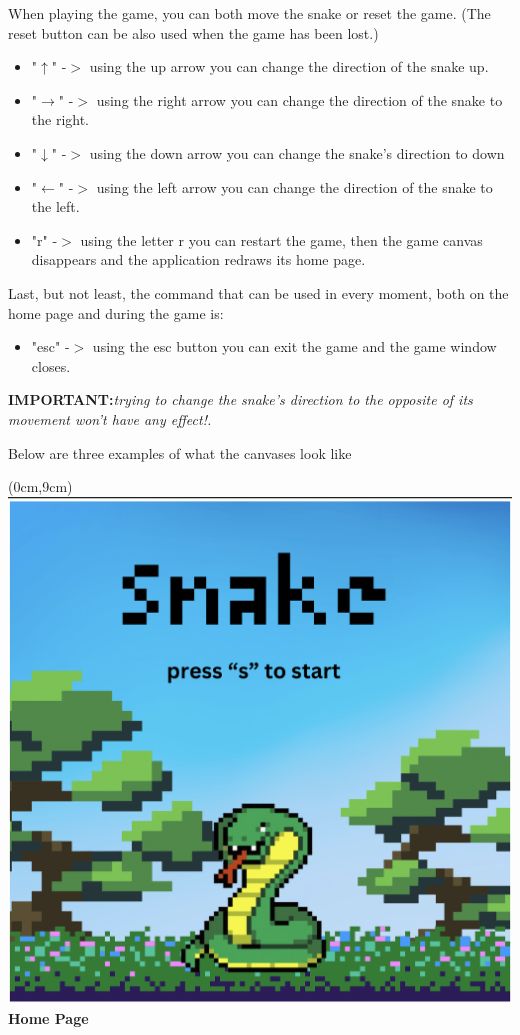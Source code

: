 \documentclass{article}
\begin{document}
	\noindent When playing the game, you can both move the snake or reset the game.  (The reset button can be also used when the game has been lost.)
	\begin{itemize}
		\item "$\uparrow$" -$>$ using the up arrow you can change the direction of the snake up.
		\item "$\rightarrow$" -$>$ using the right arrow you can change the direction of the snake to the right.
		\item "$\downarrow$" -$>$ using the down arrow you can change the snake's direction to down
		\item "$\leftarrow$" -$>$ using the left arrow you can change the direction of the snake to the left.
		\item "r" -$>$ using the letter r you can restart the game, then the game canvas disappears and the application redraws its home page.
	\end{itemize}
	
	\noindent Last, but not least, the command that can be used in every moment, both on the home page and during the game is:
	
	\begin{itemize}
		\item "esc" -$>$ using the esc button you can exit the game and the game window closes.
	\end{itemize}
	
	\noindent\large{\textbf{IMPORTANT:}}\emph{trying to change the snake's direction to the opposite of its movement won't have any effect!.}\\
	
	\begin{centering}
		\centering Below are three examples of what the canvases look like
	\end{centering}
	
	\begin{textblock*}{10cm}(0cm,9cm)
		\centering
		\includegraphics[width=.5\linewidth]{home.png}\\
		\Large{\textbf{Home Page}}
	\end{textblock*}
	
\end{document}
